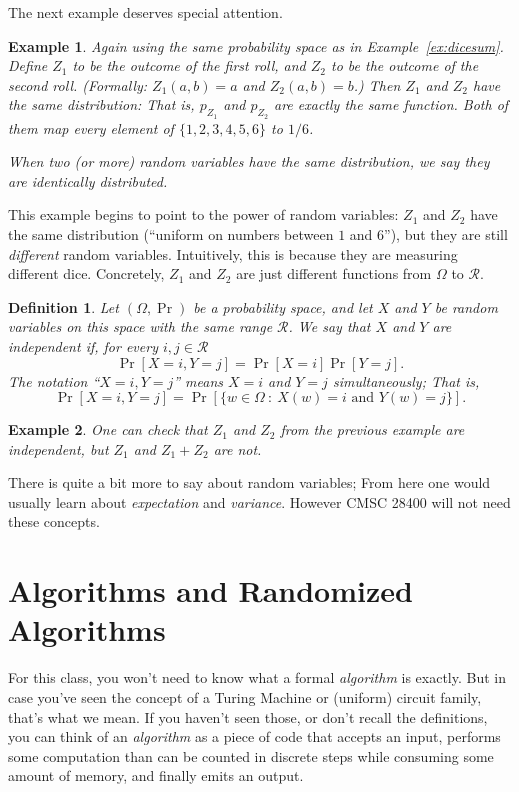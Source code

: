 \documentclass[11pt]{article}
\newtheorem{definition}{Definition}
\newtheorem{example}{Example}
\newcommand{\rvrange}{\mathcal{R}}
\begin{document}
The next example deserves special attention.
\begin{example}
    Again
    using the same probability space as in Example~\ref{ex:dicesum}.
    Define $Z_1$ to be the outcome of the first roll, and $Z_2$ to be
    the outcome of the second roll. (Formally: $Z_1(a,b) = a$ and
    $Z_2(a,b)=b$.)
    Then $Z_1$ and $Z_2$ have the same distribution:
    That is, $p_{Z_1}$ and $p_{Z_2}$ are \emph{exactly the same function}.
    Both of them map every element of $\{1,2,3,4,5,6\}$ to $1/6$.

    When two (or more) random variables have the same distribution, we say
    they are \emph{identically distributed}.
\end{example}
This example begins to point to the power of random variables: $Z_1$ and $Z_2$
have the same distribution (``uniform on numbers between $1$ and $6$''),
but they are still \emph{different} random variables. 
Intuitively, this is
because they are measuring different dice. Concretely, $Z_1$ and $Z_2$ are
just different functions from $\Omega$ to $\rvrange$.

\begin{definition}
    Let $(\Omega,\Pr)$ be a probability space, and let $X$ and $Y$ be
    random variables on this space with the same range $\rvrange$. 
    We say that $X$ and $Y$ are independent
    if, for every $i,j\in\rvrange$
    \[
        \Pr[X=i,Y=j] = \Pr[X=i]\Pr[Y=j].
    \]
    The notation ``$X=i,Y=j$'' means $X=i$ and $Y=j$ simultaneously; That is,
    \[
        \Pr[X=i,Y=j] = \Pr[\{w\in\Omega \ : \ X(w)=i \text{ and } Y(w)=j\}].
    \]
\end{definition}

\begin{example}
    One can check that $Z_1$ and $Z_2$ from the previous example are
    independent, but $Z_1$ and $Z_1+Z_2$ are not.
\end{example}

There is quite a bit more to say about random variables; From here one would
usually learn about \emph{expectation} and \emph{variance}. However CMSC
28400 will not need these concepts.


\section{Algorithms and Randomized Algorithms}

For this class, you won't need to know what a formal \emph{algorithm} is
exactly. But in case you've seen the concept of a Turing Machine or 
(uniform) circuit family, that's what we mean. If you haven't seen those, or
don't recall the definitions, you can think of an \emph{algorithm} as
a piece of code that accepts an input, performs some computation than
can be counted in discrete steps while consuming some amount of memory,
and finally emits an output. 
\end{document}
